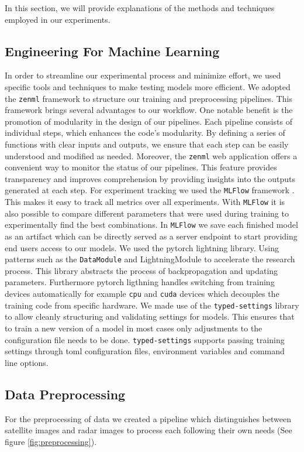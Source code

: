 In this section, we will provide explanations of the methods and techniques employed in our experiments.

\subsection{Engineering For Machine Learning}
In order to streamline our experimental process and minimize effort, we used specific tools and techniques to make
testing models more efficient.
We adopted the \texttt{zenml} \cite{zenml} framework to structure our training and preprocessing pipelines.
This framework brings several advantages to our workflow.
One notable benefit is the promotion of modularity in the design of our pipelines.
Each pipeline consists of individual steps, which enhances the code's modularity.
By defining a series of functions with clear inputs and outputs,
we ensure that each step can be easily understood and modified as needed.
Moreover, the \texttt{zenml} web application offers a convenient way to monitor the status of our pipelines.
This feature provides transparency and improves comprehension by providing insights into the outputs generated at each step.
For experiment tracking we used the \texttt{MLFlow} framework \cite{mlflow}.
This makes it easy to track all metrics over all experiments.
With \texttt{MLFlow} it is also possible to compare different parameters that were used during training to experimentally find the best combinations.
In \texttt{MLFlow} we save each finished model as an artifact which can be directly served as a server endpoint to start providing end users access to our models.
We used the pytorch lightning library. Using patterns such as the \texttt{DataModule} and {LightningModule} to accelerate the
research process. This library abstracts the process of backpropagation and updating parameters.
Furthermore pytorch ligthning \cite{lightning} handles
switching from training devices automatically for example \texttt{cpu} and \texttt{cuda} devices
which decouples the training code from specific hardware.
We made use of the \texttt{typed-settings} library \cite{typed} to allow cleanly structuring and validating settings for models.
This ensures that to train a new version of a model in most cases only adjustments to the configuration file needs to be done.
\texttt{typed-settings} supports passing training settings through toml configuration files, environment variables and command line options.

\subsection{Data Preprocessing}
For the preprocessing of data we created a pipeline which distinguishes between satellite images and radar images to process each following their own needs (See figure \ref{fig:preprocessing}).
\smallskip


